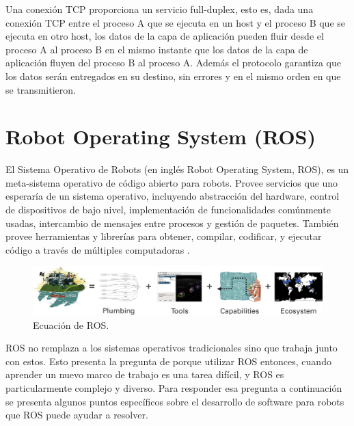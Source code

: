 \documentclass[withindex,glossary]{cam-thesis}
\begin{document}
Una conexión TCP proporciona un servicio full-duplex, esto es, dada una conexión TCP entre el proceso A que se ejecuta en un host y el proceso B que se ejecuta en otro host, los datos de la capa de aplicación pueden fluir desde el proceso A al proceso B en el mismo instante que los datos de la capa de aplicación fluyen del proceso B al proceso A. Además el protocolo garantiza que los datos serán entregados en su destino, sin errores y en el mismo orden en que se transmitieron.

\section{Robot Operating System (ROS)}
El Sistema Operativo de Robots (en inglés Robot Operating System, ROS), es un meta-sistema operativo de código abierto para robots. Provee servicios que uno esperaría de un sistema operativo, incluyendo abstracción del hardware, control de dispositivos de bajo nivel, implementación de funcionalidades comúnmente usadas, intercambio de mensajes entre procesos y gestión de paquetes. También provee herramientas y librerías para obtener, compilar, codificar, y ejecutar código a través de múltiples computadoras \cite{wikiROS}.

\begin{figure}[H]
  \centering
  \includegraphics[width=\textwidth]{images/ros_equation}
  \caption[Ecuación de ROS]{Ecuación de ROS.}
\end{figure}

ROS no remplaza a los sistemas operativos tradicionales sino que trabaja junto con estos. Esto presenta la pregunta de porque utilizar ROS entonces, cuando aprender un nuevo marco de trabajo es una tarea difícil, y ROS es particularmente complejo y diverso. Para responder esa pregunta a continuación se presenta algunos puntos específicos sobre el desarrollo de software para robots que ROS puede ayudar a resolver.
\end{document}
